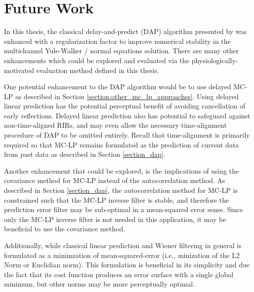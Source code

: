 %
%


\section{Future Work}

In this thesis, the classical delay-and-predict (DAP) algorithm presented by \cite{triki2006delay} was enhanced with a regularization factor to improve numerical stability in the multichannel Yule-Walker / normal equations solution. There are many other enhancements which could be explored and evaluated via the physiologically-motivated evaluation method defined in this thesis. 

One potential enhancement to the DAP algorithm would be to use delayed MC-LP as described in Section \ref{section:other_mc_lp_approaches}. Using delayed linear prediction has the potential perceptual benefit of avoiding cancellation of early reflections. Delayed linear prediction also has potential to safeguard against non-time-aligned RIRs, and may even allow the necessary time-alignment procedure of DAP to be omitted entirely. Recall that time-alignment is primarily required so that MC-LP remains formulated as the prediction of current data from past data as described in Section \ref{section_dap}.

Another enhancement that could be explored, is the implications of using the covariance method for MC-LP instead of the autocorrelation method. As described in Section \ref{section_dap}, the autocorrelation method for MC-LP is constrained such that the MC-LP inverse filter is stable, and therefore the prediction error filter may be sub-optimal in a mean-squared error sense. Since only the MC-LP inverse filter is not needed in this application, it may be beneficial to use the covariance method. 

Additionally, while classical linear prediction and Wiener filtering in general is formulated as a minimzation of mean-squared-error (i.e., minization of the L2 Norm or Euclidian norm). This formulation is beneficial in its simplicity and due the fact that its cost function produces an error surface with a single global minimum, but other norms may be more perceptually optimal.

